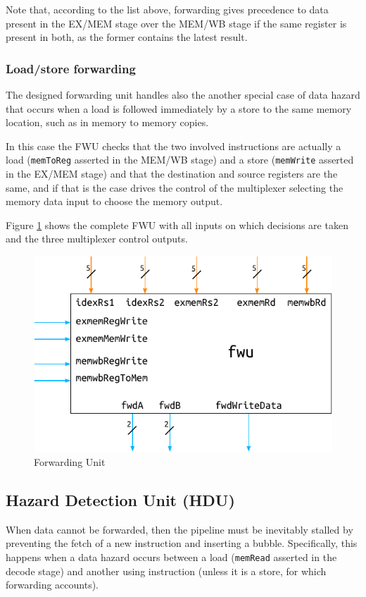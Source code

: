 \documentclass[a4paper]{article}
\begin{document}
Note that, according to the list above, forwarding gives precedence to data present in the EX/MEM stage over the MEM/WB stage if the same register is present in both, as the former contains the latest result.

\subsubsection{Load/store forwarding}
The designed forwarding unit handles also the another special case of data hazard that occurs when a load is followed immediately by a store to the same memory location, such as in memory to memory copies. 

In this case the FWU checks that the two involved instructions are actually a load (\texttt{memToReg} asserted in the MEM/WB stage) and a store (\texttt{memWrite} asserted in the EX/MEM stage) and that the destination and source registers are the same, and if that is the case drives the control of the multiplexer selecting the memory data input to choose the memory output.

Figure \ref{fig:fwu} shows the complete FWU with all inputs on which decisions are taken and the three multiplexer control outputs.

\begin{figure}[hbtp]
    \centering
    \includegraphics[]{../fwu/ref/schematic/fwu.pdf}
    \caption{Forwarding Unit}
    \label{fig:fwu}
\end{figure}

\subsection{Hazard Detection Unit (HDU)}
When data cannot be forwarded, then the pipeline must be inevitably stalled by preventing the fetch of a new instruction and inserting a bubble. Specifically, this happens when a data hazard occurs between a load (\texttt{memRead} asserted in the decode stage) and another using instruction (unless it is a store, for which forwarding accounts).
\end{document}
